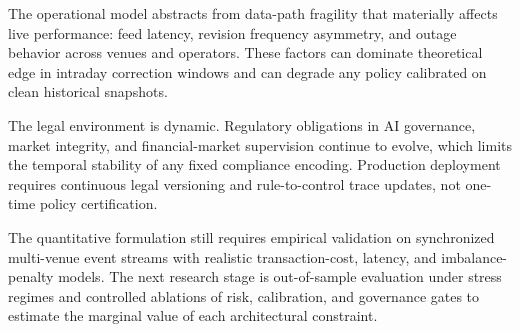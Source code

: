 \documentclass[oneside,10pt]{swissi}
\begin{document}
The operational model abstracts from data-path fragility that materially affects live performance: feed latency, revision frequency asymmetry, and outage behavior across venues and operators. These factors can dominate theoretical edge in intraday correction windows and can degrade any policy calibrated on clean historical snapshots.\cite{nord_pool_intraday_2026,acer_market_coupling_development_2026}

The legal environment is dynamic. Regulatory obligations in AI governance, market integrity, and financial-market supervision continue to evolve, which limits the temporal stability of any fixed compliance encoding. Production deployment requires continuous legal versioning and rule-to-control trace updates, not one-time policy certification.\cite{eu_reg_2024_1689_ai_act,eu_reg_2011_1227_remit,eu_dir_2014_65_mifid2,eu_reg_2014_600_mifir}

The quantitative formulation still requires empirical validation on synchronized multi-venue event streams with realistic transaction-cost, latency, and imbalance-penalty models. The next research stage is out-of-sample evaluation under stress regimes and controlled ablations of risk, calibration, and governance gates to estimate the marginal value of each architectural constraint.\cite{rockafellar_uryasev_2000_cvar,angelopoulos_bates_2021_conformal,nist_ai_rmf_2023}

\bigskip

\printbibliography

\swDeclarationsPage
\end{document}
